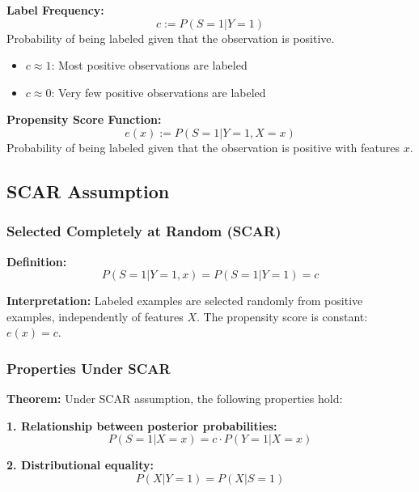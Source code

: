 \documentclass[12pt,a4paper]{article}
\begin{document}
\textbf{Label Frequency:}
\begin{equation}
c := P(S = 1|Y = 1)
\end{equation}
Probability of being labeled given that the observation is positive.
\begin{itemize}
    \item $c \approx 1$: Most positive observations are labeled
    \item $c \approx 0$: Very few positive observations are labeled
\end{itemize}

\textbf{Propensity Score Function:}
\begin{equation}
e(x) := P(S = 1|Y = 1, X = x)
\end{equation}
Probability of being labeled given that the observation is positive with features $x$.

\subsection{SCAR Assumption}

\subsubsection{Selected Completely at Random (SCAR)}

\textbf{Definition:}
\begin{equation}
P(S = 1|Y = 1, x) = P(S = 1|Y = 1) = c
\end{equation}

\textbf{Interpretation:} Labeled examples are selected randomly from positive examples, independently of features $X$. The propensity score is constant: $e(x) = c$.

\subsubsection{Properties Under SCAR}

\textbf{Theorem:} Under SCAR assumption, the following properties hold:

\textbf{1. Relationship between posterior probabilities:}
\begin{equation}
P(S = 1|X = x) = c \cdot P(Y = 1|X = x)
\end{equation}

\textbf{2. Distributional equality:}
\begin{equation}
P(X|Y = 1) = P(X|S = 1)
\end{equation}
\end{document}
